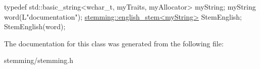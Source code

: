 \begin{DoxyCode}
\textcolor{keyword}{typedef} std::basic\_string<wchar\_t, myTraits, myAllocator> myString;
myString word(L\textcolor{stringliteral}{"documentation"});
\hyperlink{classstemming_1_1english__stem}{stemming::english\_stem<myString>} StemEnglish;
StemEnglish(word);
\end{DoxyCode}
 

The documentation for this class was generated from the following file\-:\begin{DoxyCompactItemize}
\item 
stemming/stemming.\-h\end{DoxyCompactItemize}
